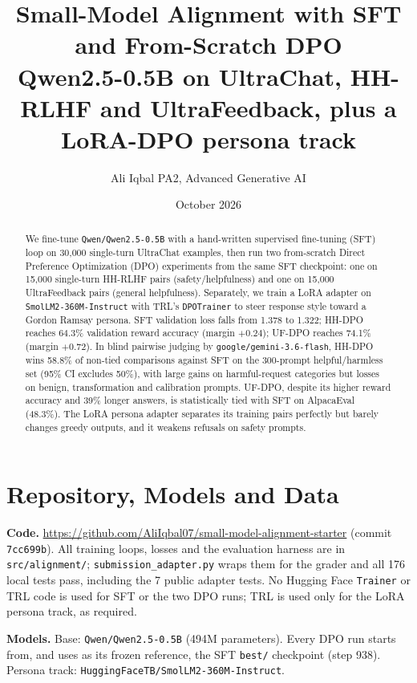 \documentclass[10pt]{article}
\title{\vspace{-1.2em}\textbf{Small-Model Alignment with SFT and From-Scratch DPO}\\[2pt]
\large Qwen2.5-0.5B on UltraChat, HH-RLHF and UltraFeedback, plus a LoRA-DPO persona track}
\author{Ali Iqbal \quad\textbar\quad PA2, Advanced Generative AI}
\date{\vspace{-0.6em}October 2026}
\newcommand{\repo}{\url{https://github.com/AliIqbal07/small-model-alignment-starter}}
\begin{document}
\maketitle
\vspace{-1.2em}

\begin{abstract}
\noindent
We fine-tune \texttt{Qwen/Qwen2.5-0.5B} with a hand-written supervised fine-tuning (SFT) loop on
30{,}000 single-turn UltraChat examples, then run two from-scratch Direct Preference Optimization
(DPO) experiments from the same SFT checkpoint: one on 15{,}000 single-turn HH-RLHF pairs
(safety/helpfulness) and one on 15{,}000 UltraFeedback pairs (general helpfulness). Separately, we
train a LoRA adapter on \texttt{SmolLM2-360M-Instruct} with TRL's \texttt{DPOTrainer} to steer
response style toward a Gordon Ramsay persona. SFT validation loss falls from 1.378 to 1.322;
HH-DPO reaches 64.3\% validation reward accuracy (margin $+0.24$); UF-DPO reaches
74.1\% (margin $+0.72$). In blind pairwise judging by \texttt{google/gemini-3.6-flash}, HH-DPO wins
58.8\% of non-tied comparisons against SFT on the 300-prompt helpful/harmless set (95\% CI excludes
50\%), with large gains on harmful-request categories but losses on benign, transformation and
calibration prompts. UF-DPO, despite its higher reward accuracy and 39\% longer answers, is
statistically tied with SFT on AlpacaEval (48.3\%). The LoRA persona adapter separates its training
pairs perfectly but barely changes greedy outputs, and it weakens refusals on safety prompts.
\end{abstract}

\section{Repository, Models and Data}
\textbf{Code.} \repo{} (commit \texttt{7cc699b}). All training loops, losses and the evaluation harness are
in \texttt{src/alignment/}; \texttt{submission\_adapter.py} wraps them for the grader and all
176 local tests pass, including the 7 public adapter tests. No Hugging Face \texttt{Trainer} or TRL
code is used for SFT or the two DPO runs; TRL is used only for the LoRA persona track, as required.

\textbf{Models.} Base: \texttt{Qwen/Qwen2.5-0.5B} (494M parameters). Every DPO run starts from, and
uses as its frozen reference, the SFT \texttt{best/} checkpoint (step 938). Persona track:
\texttt{HuggingFaceTB/SmolLM2-360M-Instruct}.
\end{document}
